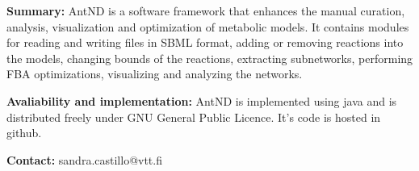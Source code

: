 \textbf{Summary:} AntND is a software framework that enhances the manual curation, analysis, visualization and optimization of metabolic models. It contains modules for reading and writing files in SBML format, adding or removing reactions into the models, changing bounds of the reactions, extracting subnetworks, performing FBA optimizations, visualizing and analyzing the networks.  

\textbf{Avaliability and implementation:} AntND is implemented using java and is distributed freely under GNU General Public Licence. It's code is hosted in github. 

\textbf{Contact:} sandra.castillo@vtt.fi
